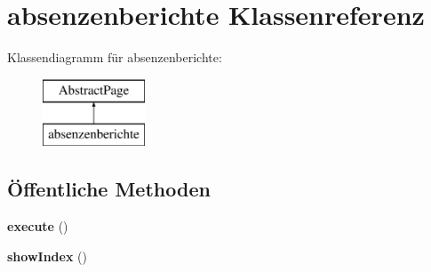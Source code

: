 \hypertarget{classabsenzenberichte}{}\section{absenzenberichte Klassenreferenz}
\label{classabsenzenberichte}
Klassendiagramm für absenzenberichte\+:\begin{figure}[H]
\begin{center}
\leavevmode
\includegraphics[height=2.000000cm]{classabsenzenberichte}
\end{center}
\end{figure}
\subsection*{Öffentliche Methoden}
\begin{DoxyCompactItemize}
\item 
\mbox{\label{classabsenzenberichte_aebdf94ffbc69d419e27796463be742bf}} 
{\bfseries execute} ()
\item 
\mbox{\label{classabsenzenberichte_a9d8549190069ab825c35d54cb0b4bfb4}} 
{\bfseries show\+Index} ()
\end{DoxyCompactItemize}
